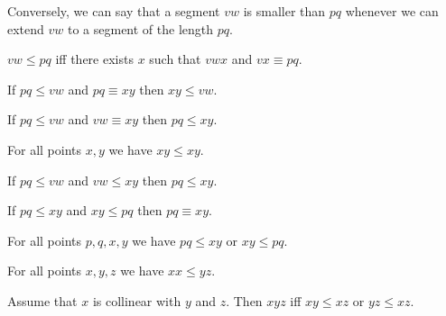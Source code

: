 \documentclass[10pt,a4paper,parskip=half,numbers=endperiod,headings=standardclasses,parskip]{scrbook}
\newcommand{\Cong}[4]{#1 #2 \equiv #3 #4}
\newcommand{\Betw}[3]{#1 #2 #3}
\newcommand{\Leq}[4]{#1 #2 \leq #3 #4}
\begin{document}
  Conversely, we can say that a segment $vw$ is smaller than $pq$ whenever we can extend $vw$
  to a segment of the length $pq$.

    \begin{axiom} %
      $\Leq{v}{w}{p}{q}$ iff there exists $x$ such that $\Betw{v}{w}{x}$ and $\Cong{v}{x}{p}{q}$.
    \end{axiom}

  \begin{forthel}
    \begin{lemma}[LessCongLeft] %
      If $\Leq{p}{q}{v}{w}$ and $\Cong{p}{q}{x}{y}$
      then $\Leq{x}{y}{v}{w}$.
    \end{lemma}

    \begin{lemma}[LessCongRight] %
      If $\Leq{p}{q}{v}{w}$ and $\Cong{v}{w}{x}{y}$
      then $\Leq{p}{q}{x}{y}$.
    \end{lemma}

    \begin{lemma}[LessReflexivity] %
      For all points $x, y$ we have $\Leq{x}{y}{x}{y}$.
    \end{lemma}

    \begin{lemma}[LessTransitivity] %
      If $\Leq{p}{q}{v}{w}$ and $\Leq{v}{w}{x}{y}$ then $\Leq{p}{q}{x}{y}$.
    \end{lemma}

    \begin{axiom}[LessClamp] %
      If $\Leq{p}{q}{x}{y}$ and $\Leq{x}{y}{p}{q}$ then $\Cong{p}{q}{x}{y}$.
    \end{axiom}

    \begin{axiom}[LessConnex] %
      For all points $p, q, x, y$ we have $\Leq{p}{q}{x}{y}$ or $\Leq{x}{y}{p}{q}$.
    \end{axiom}

    \begin{lemma} %
      For all points $x, y, z$ we have $\Leq{x}{x}{y}{z}$.
    \end{lemma}

    \begin{axiom} %
      Assume that $x$ is collinear with $y$ and $z$.
      Then $\Betw{x}{y}{z}$ iff $\Leq{x}{y}{x}{z}$ or $\Leq{y}{z}{x}{z}$.
    \end{axiom}
  \end{forthel}
\end{document}
